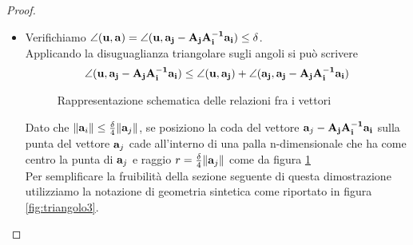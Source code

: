 \documentclass[a4paper,11pt,openright,twoside	]{book}
\begin{document}
\begin{proof}
\begin{itemize}
\item Verifichiamo $ \angle (\vb{u, a})  = \angle (\vb{u} , \vb{a_j - A_j A_i^{-1} a_i} ) \leq \delta $. \\Applicando la disuguaglianza triangolare sugli angoli si può scrivere
\begin{equation}
\label{eq:angle}
\angle ( \vb{u} , \vb{a_j - A_j A_i^{-1} a_i} ) \leq \angle (\vb{u} , \vb{a_j}) + \angle(\vb{a_j}, \vb{a_j- A_j A_i^{-1} a_i} ) 
\end{equation}
\begin{figure}[!h]
\centering
{}
\caption{Rappresentazione schematica delle relazioni fra i vettori}
\label{fig:palla}
\end{figure} 

Dato che $ \norm{\vb{a}_i} \leq \frac{\delta}{4}\norm{\vb{a}_j}$, se posiziono la coda del vettore $\vb{a}_j - \vb{A_j A_i^{-1} a_i}$ sulla punta del vettore $\vb{a}_j$ cade all'interno di una palla n-dimensionale che ha come centro la punta di $\vb{a}_j$ e raggio $r = \frac{\delta}{4}\norm{\vb{a}_j}$ come da figura \ref{fig:palla} \\
\newpage
Per semplificare la fruibilità della sezione seguente di questa dimostrazione utilizziamo la notazione di geometria sintetica come riportato in figura \ref{fig:triangolo3}.


\end{itemize}
\end{proof}
\end{document}
